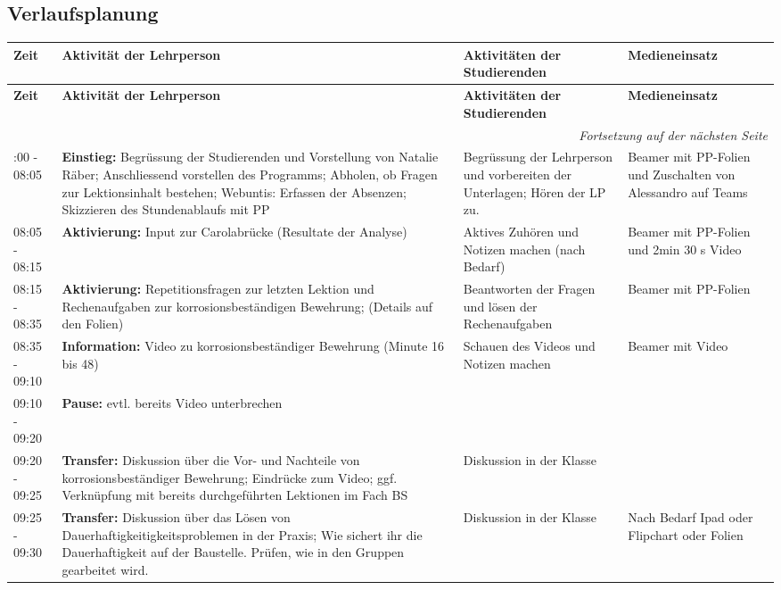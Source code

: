 \documentclass[
11pt,
captions=tableheading,
headsepline,
footsepline, 
captions=tableheading,
parskip=half-,
]{scrartcl}
\begin{document}
\begin{landscape}
\subsection{Verlaufsplanung}
\begin{longtable}{@{}l|p{9cm}p{7.5cm}p{3.5cm}@{}}
    \toprule
    \textbf{Zeit} & \textbf{Aktivität der Lehrperson} & \textbf{Aktivitäten der Studierenden} & \textbf{Medieneinsatz} \\
    \midrule
    \endfirsthead
    \toprule
    \textbf{Zeit} & \textbf{Aktivität der Lehrperson} & \textbf{Aktivitäten der Studierenden} & \textbf{Medieneinsatz} \\
    \midrule
    \endhead
    \midrule
    \multicolumn{4}{r}{\textit{Fortsetzung auf der nächsten Seite}} \\
    \midrule
    \endfoot
    \bottomrule
    \endlastfoot
    \midrule
    08:00 - 08:05 & \textbf{Einstieg: }Begrüssung der Studierenden und Vorstellung von Natalie Räber; Anschliessend vorstellen des Programms; Abholen, ob Fragen zur Lektionsinhalt bestehen; Webuntis: Erfassen der Absenzen; Skizzieren des Stundenablaufs mit PP & Begrüssung der Lehrperson und vorbereiten der Unterlagen; Hören der LP zu. & Beamer mit PP-Folien und Zuschalten von Alessandro auf Teams\\
    \midrule
    08:05 - 08:15 & \textbf{Aktivierung: } Input zur Carolabrücke (Resultate der Analyse) & Aktives Zuhören und Notizen machen (nach Bedarf) & Beamer mit PP-Folien und 2min 30 s Video\\
    \midrule
    08:15 - 08:35 & \textbf{Aktivierung:} Repetitionsfragen zur letzten Lektion und Rechenaufgaben zur korrosionsbeständigen Bewehrung; (Details auf den Folien) & Beantworten der Fragen und lösen der Rechenaufgaben  & Beamer mit PP-Folien\\
    \midrule
    08:35 - 09:10 & \textbf{Information:} Video zu korrosionsbeständiger Bewehrung (Minute 16 bis 48) & Schauen des Videos und Notizen machen & Beamer mit Video\\
    \midrule
    09:10 - 09:20 & \textbf{Pause:} evtl. bereits Video unterbrechen {} & {}\\
    \midrule
    09:20 - 09:25 & \textbf{Transfer:} Diskussion über die Vor- und Nachteile von korrosionsbeständiger Bewehrung; Eindrücke zum Video; ggf. Verknüpfung mit bereits durchgeführten Lektionen im Fach BS & Diskussion in der Klasse & {}\\
    \midrule
    09:25 - 09:30 & \textbf{Transfer:} Diskussion über das Lösen von Dauerhaftigkeitigkeitsproblemen in der Praxis; Wie sichert ihr die Dauerhaftigkeit auf der Baustelle. Prüfen, wie in den Gruppen gearbeitet wird. & Diskussion in der Klasse & Nach Bedarf Ipad oder Flipchart oder Folien \\

\end{longtable}
\end{landscape}
\end{document}
